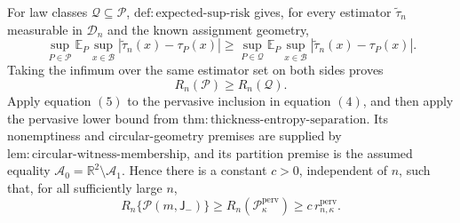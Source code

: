 For law classes \(\mathcal Q\subseteq\mathcal P\), \(\mathrm{def:expected\text{-}sup\text{-}risk}\) gives, for every estimator \(\widetilde\tau_n\) measurable in \(\mathcal D_n\) and the known assignment geometry,
\[
 \sup_{P\in\mathcal P}
 \mathbb E_P\sup_{x\in\mathcal B}
 |\widetilde\tau_n(x)-\tau_P(x)|
 \ge
 \sup_{P\in\mathcal Q}
 \mathbb E_P\sup_{x\in\mathcal B}
 |\widetilde\tau_n(x)-\tau_P(x)|.
\]
Taking the infimum over the same estimator set on both sides proves
\[
 R_n(\mathcal P)\ge R_n(\mathcal Q). \tag{5}
\]
Apply equation \((5)\) to the pervasive inclusion in equation \((4)\), and then apply the pervasive lower bound from \(\mathrm{thm:thickness\text{-}entropy\text{-}separation}\).  Its nonemptiness and circular-geometry premises are supplied by \(\mathrm{lem:circular\text{-}witness\text{-}membership}\), and its partition premise is the assumed equality \(\mathcal A_0=\mathbb R^2\setminus\mathcal A_1\).  Hence there is a constant \(c>0\), independent of \(n\), such that, for all sufficiently large \(n\),
\[
 R_n\{\mathcal P(m,\mathsf J_-)\}
 \ge R_n(\mathcal P_\kappa^{\mathrm{perv}})
 \ge c\,r_{n,\kappa}^{\mathrm{perv}}. \tag{6}
\]

